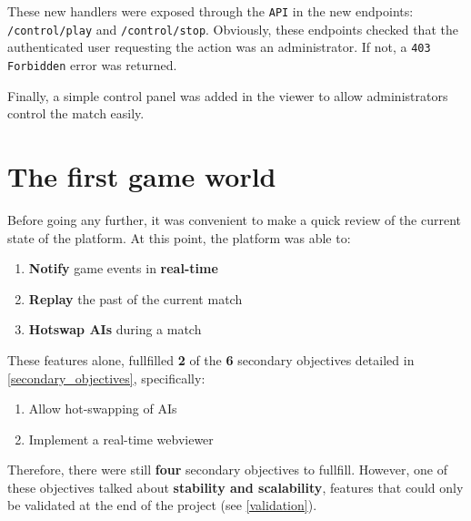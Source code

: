 \documentclass[a4paper,11pt,titlepage,abstract,numbers=noenddot,automark,mnsy,intlimits,rgb,dvipsnames]{report}
\begin{document}
These new handlers were exposed through the \texttt{API} in the new endpoints: \texttt{/control/play} and \texttt{/control/stop}. Obviously,
these endpoints checked that the authenticated user requesting the action was an administrator. If not, a \texttt{403 Forbidden}
error was returned.

Finally, a simple control panel was added in the viewer to allow administrators control the match easily.
\chapter{The first game world}
\label{first_game_world}
Before going any further, it was convenient to make a quick review of the current state of the platform. At this point,
the platform was able to:
\begin{enumerate}
\item
\textbf{Notify} game events in \textbf{real-time}
\item
\textbf{Replay} the past of the current match
\item
\textbf{Hotswap AIs} during a match
\end{enumerate}
These features alone, fullfilled \textbf{2} of the \textbf{6} secondary objectives detailed in \autoref{secondary_objectives},
specifically:
\begin{enumerate}
\item
Allow hot-swapping of AIs
\item
Implement a real-time webviewer
\end{enumerate}
Therefore, there were still \textbf{four} secondary objectives to fullfill. However, one of these objectives talked about
\textbf{stability and scalability}, features that could only be validated at the end of the project (see \autoref{validation}).
\end{document}
